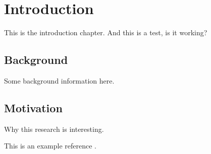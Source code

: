 \chapter*{Introduction}
This is the introduction chapter. And this is a test, is it working?

\section{Background}
Some background information here.

\section{Motivation}
Why this research is interesting.

This is an example reference \cite{riviere2008}.
